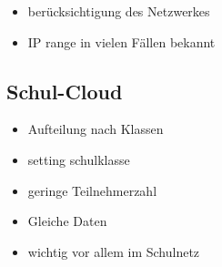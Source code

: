 \begin{itemize}
	\item berücksichtigung des Netzwerkes
	\item IP range in vielen Fällen bekannt
\end{itemize}
\subsection{Schul-Cloud}
\begin{itemize}
	\item Aufteilung nach Klassen
	\item setting schulklasse
	\item geringe Teilnehmerzahl 
	\item Gleiche Daten
	\item wichtig vor allem im Schulnetz
\end{itemize}

